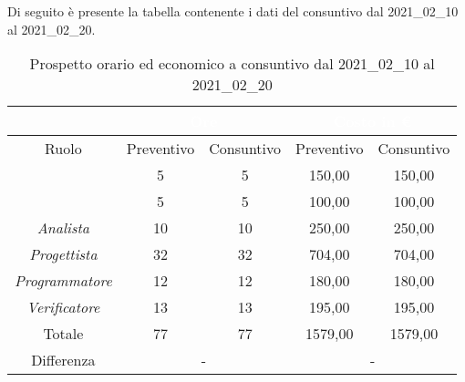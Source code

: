 Di seguito è presente la tabella contenente i dati del consuntivo dal 2021\_02\_10 al 2021\_02\_20.
\begin{table}[H]
	\centering
	\begin{tabular}{|c|c|c|c|c|}
		\rowcolor{darkblue} 
		&\multicolumn{2}{c|}{\textcolor{white}{Ore}}&\multicolumn{2}{c|}{\textcolor{white}{Costo in €}}\\ \hline
		Ruolo			&	Preventivo				&	Consuntivo		&	Preventivo	&	Consuntivo\\ \hline
		{\Responsabile}		&	5					&	5				&	150,00		&	150,00 \\ \hline
		{\Amministratore}	&	5					&	5				&	100,00		&	100,00 \\ \hline
		\textit{Analista}	&	10					&	10				&	250,00		&	250,00 \\ \hline
		\textit{Progettista}& 	32					&   32 				& 	704,00		&  	704,00 \\ \hline
		\textit{Programmatore}& 12					& 	12				& 	180,00		&  	180,00 \\ \hline
		\textit{Verificatore}&	13					&	13				&	195,00		&	195,00 \\ \hline
		Totale				&	77					&	77				&	1579,00		&	1579,00 \\ \hline
		Differenza			& 	\multicolumn{2}{c|}{-} 			        &\multicolumn{2}{c|}{-}\\ \hline
	\end{tabular}
	\caption{Prospetto orario ed economico a consuntivo dal 2021\_02\_10 al 2021\_02\_20}
\end{table}

